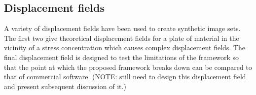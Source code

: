 \documentclass[12pt,oneside,openany,a4paper, %
english, %
masters-t, goldenblock]{usthesis}
\begin{document}








\subsection{Displacement fields}
A variety of displacement fields have been used to create synthetic image sets. The first two give theoretical displacement fields for a plate of material in the vicinity of a stress concentration which causes complex displacement fields. The final displacement field is designed to test the limitations of the framework so that the point at which the proposed framework breaks down can be compared to that of commercial software. (NOTE: still need to design this displacement field and present subsequent discussion of it.)
\end{document}
